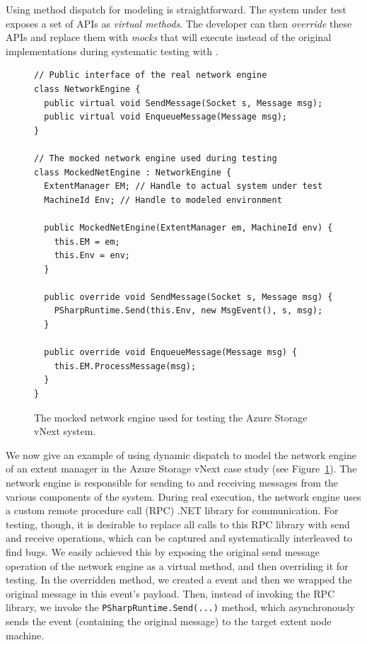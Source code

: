 Using method dispatch for modeling is straightforward. The system under test exposes a set of APIs as \emph{virtual methods}. The developer can then \emph{override} these APIs and replace them with \emph{mocks} that will execute instead of the original implementations during systematic testing with \psharp.

\begin{figure}[t]
\begin{lstlisting}
// Public interface of the real network engine
class NetworkEngine {
  public virtual void SendMessage(Socket s, Message msg);
  public virtual void EnqueueMessage(Message msg);
}

// The mocked network engine used during testing
class MockedNetEngine : NetworkEngine {
  ExtentManager EM; // Handle to actual system under test
  MachineId Env; // Handle to modeled environment
  
  public MockedNetEngine(ExtentManager em, MachineId env) {
    this.EM = em;
    this.Env = env;
  }
  
  public override void SendMessage(Socket s, Message msg) {
    PSharpRuntime.Send(this.Env, new MsgEvent(), s, msg);
  }
  
  public override void EnqueueMessage(Message msg) {
    this.EM.ProcessMessage(msg);
  }
}
\end{lstlisting}
\vspace{-2mm}
\caption{The mocked network engine used for testing the Azure Storage vNext system.}
\label{fig:enginecode}
\end{figure}

We now give an example of using dynamic dispatch to model the network engine of an extent manager in the Azure Storage vNext case study (see Figure~\ref{fig:enginecode}). The network engine is responsible for sending to and receiving messages from the various components of the system. During real execution, the network engine uses a custom remote procedure call (RPC) .NET library for communication. For testing, though, it is desirable to replace all calls to this RPC library with \psharp send and receive operations, which can be captured and systematically interleaved to find bugs. We easily achieved this by exposing the original send message operation of the network engine as a virtual method, and then overriding it for testing. In the overridden method, we created a \psharp event and then we wrapped the original message in this event's payload. Then, instead of invoking the RPC library, we invoke the \texttt{PSharpRuntime.Send(...)} method, which asynchronously sends the event (containing the original message) to the target extent node machine.

